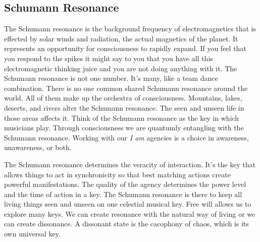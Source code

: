 \subsection{Schumann Resonance}\label{schumann-resonance}

The Schumann resonance is the background frequency of electromagnetics
that is effected by solar winds and radiation, the actual magnetics of
the planet. It represents an opportunity for consciousness to rapidly
expand. If you feel that you respond to the spikes it might say to you
that you have all this electromagnetic thinking juice and you are not
doing anything with it. The Schumann resonance is not one number. It's
many, like a team dance combination. There is no one common shared
Schumann resonance around the world. All of them make up the orchestra
of consciousness. Mountains, lakes, deserts, and rivers alter the
Schumann resonance. The seen and unseen life in those areas affects it.
Think of the Schumann resonance as the key in which musicians play.
Through consciousness we are quantumly entangling with the Schumann
resonance. Working with our \emph{I am} agencies is a choice in
awareness, unawareness, or both.

The Schumann resonance determines the veracity of interaction. It's the
key that allows things to act in synchronicity so that best matching
actions create powerful manifestations. The quality of the agency
determines the power level and the time of action in a key. The Schumann
resonance is there to keep all living things seen and unseen on one
celestial musical key. Free will allows us to explore many keys. We can
create resonance with the natural way of living or we can create
dissonance. A dissonant state is the cacophony of chaos, which is its
own universal key.
